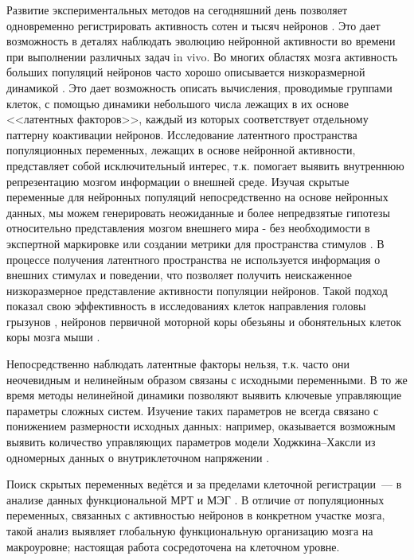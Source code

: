 

{\actuality} 

Развитие экспериментальных методов на сегодняшний день позволяет одновременно регистрировать активность сотен и тысяч нейронов \cite{Lin2015}. Это дает возможность в деталях наблюдать эволюцию нейронной активности во времени при выполнении различных задач in vivo.
Во многих областях мозга активность больших популяций нейронов часто хорошо описывается низкоразмерной динамикой \cite{Yu2009, Gallego2017, Gallego2018}. Это дает возможность описать вычисления, проводимые группами клеток, с помощью динамики небольшого числа лежащих в их основе <<латентных факторов>>, каждый из которых соответствует отдельному паттерну коактивации нейронов.
Исследование латентного пространства популяционных переменных, лежащих в основе нейронной активности, представляет собой исключительный интерес, т.к. помогает выявить внутреннюю репрезентацию мозгом информации о внешней среде. Изучая скрытые переменные для нейронных популяций непосредственно на основе нейронных данных, мы можем генерировать неожиданные и более непредвзятые гипотезы относительно представления мозгом внешнего мира - без необходимости в экспертной маркировке или создании метрики для пространства стимулов \cite{Chen2017}. В процессе получения латентного пространства не используется информация о внешних стимулах и поведении, что позволяет получить неискаженное низкоразмерное представление активности популяции нейронов. Такой подход показал свою эффективность в исследованиях клеток направления головы грызунов \cite{Chaudhuri2019} , нейронов первичной моторной коры обезьяны \cite{Gallego2018} и обонятельных клеток коры мозга мыши \cite{wu2018}.

Непосредственно наблюдать латентные факторы нельзя, т.к. часто они неочевидным и нелинейным образом связаны с исходными переменными. В то же время методы нелинейной динамики позволяют выявить ключевые управляющие параметры сложных систем. Изучение таких параметров не всегда связано с понижением размерности исходных данных: например, оказывается возможным выявить количество управляющих параметров модели Ходжкина--Хаксли из одномерных данных о внутриклеточном напряжении \cite{hernandez2020}.

Поиск скрытых переменных ведётся и за пределами клеточной регистрации~--- в анализе данных функциональной МРТ \cite{Khosla2019} и МЭГ \cite{Li2016}. В отличие от популяционных переменных, связанных с активностью нейронов в конкретном участке мозга, такой анализ выявляет глобальную функциональную организацию мозга на макроуровне; настоящая работа сосредоточена на клеточном уровне.


